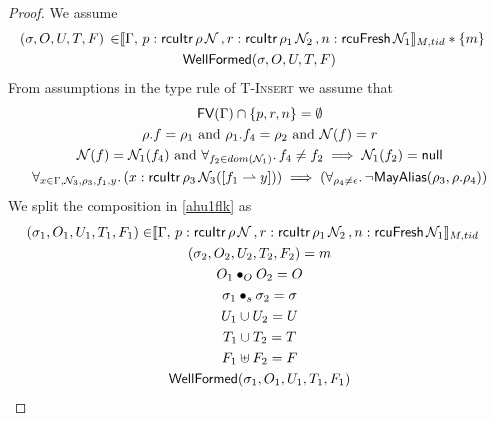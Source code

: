  \begin{proof}
 We assume
\begin{gather}\label{ahu1flk}
  \begin{aligned}
    (\sigma, O, U, T,F) \, \in &  \llbracket \Gamma,\,
 p:\textsf{rcuItr}\, \rho \, \mathcal{N} \, ,
  r:\textsf{rcuItr}\, \rho_1 \, \mathcal{N}_2 \, , n:\textsf{rcuFresh} \, \mathcal{N}_1 \rrbracket_{M,tid} * \{m\}
    \end{aligned} \\
\textsf{WellFormed}(\sigma,O,U,T,F)
\label{ahu2flk}
\end{gather}
From assumptions in the type rule of \textsc{T-Insert} we assume that
\begin{gather}
\textsf{FV}(\Gamma) \cap \{p,r,n\}  =\emptyset 
  \label{ahu3flk} \\
\rho.f  = \rho_1 \text{ and } \rho_1.f_4  = \rho_2 \text{ and } \mathcal{N}(f) = r
    \label{ahu4flk} \\
\mathcal{N}(f) = \mathcal{N}_1(f_4) \text{ and } \forall_{f_2\in dom(\mathcal{N}_1)} \ldotp f_4 \neq f_2 \implies \mathcal{N}_1(f_2)=\textsf{null}
\label{ahu5flk} \\
\begin{aligned}
  \forall_{x \in \Gamma, \mathcal{N}_3, \rho_3,f_1,y} \ldotp (x:\textsf{rcuItr}\,\rho_3\,\mathcal{N}_3([f_1\rightharpoonup y])) \implies(\forall_{\rho_4\neq \epsilon} \ldotp \neg\mathsf{MayAlias}(\rho_3, \rho.\rho_4) )
\label{ahu6flk}
  \end{aligned}
\end{gather}
We split the composition in  \ref{ahu1flk} as 
\begin{gather} \label{ahu11flk}
  \begin{aligned}
    (\sigma_1, O_{1}, U_{1}, T_{1} ,F_1) \in & \llbracket \Gamma,\,
 p:\textsf{rcuItr}\, \rho \, \N \, ,
  r:\textsf{rcuItr}\, \rho_1 \, \N_2 \, , n:\textsf{rcuFresh} \, \N_1 \rrbracket_{M,tid} \end{aligned}\\
\label{ahu12flk}
(\sigma_2, O_{2}, U_{2}, T_{2},F_2) = m
\\
\label{ahu13flk}
O_{1} \bullet_{O} O_{2} = O
\\
\label{ahusigflk}
\sigma_1 \bullet_s \sigma_2 = \sigma \\
\label{ahu14flk}
U_{1} \cup U_{2} = U
\\
\label{ahu15flk}
T_{1} \cup T_{2} = T
\\
\label{ahuffflk}
F_1 \uplus F_2 = F
\\
\label{ahu16flk}
\textsf{WellFormed}(\sigma_1,O_{1},U_{1},T_{1},F_1)
\\

\end{gather}
\end{proof}

